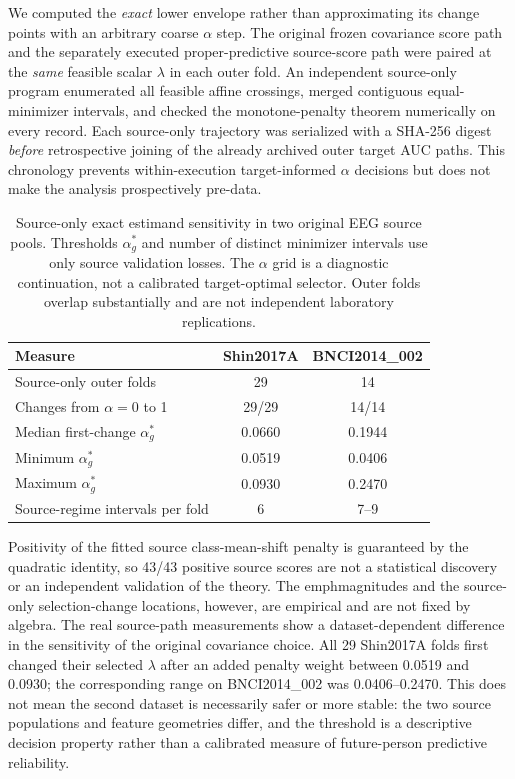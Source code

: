 We computed the \emph{exact} lower envelope rather
than approximating its change points with an
arbitrary coarse $\alpha$ step. The original frozen
covariance score path and the separately executed
proper-predictive source-score path were paired at
the \emph{same} feasible scalar $\lambda$ in each
outer fold. An independent source-only program
enumerated all feasible affine crossings, merged
contiguous equal-minimizer intervals, and checked
the monotone-penalty theorem numerically on every
record. Each source-only trajectory was serialized
with a SHA-256 digest \emph{before} retrospective
joining of the already archived outer target AUC
paths. This chronology prevents within-execution
target-informed $\alpha$ decisions but does not
make the analysis prospectively pre-data.

\begin{table}[tb]
\centering
\small
\caption{Source-only exact estimand sensitivity in two
original EEG source pools. Thresholds $\alpha_g^*$ and
number of distinct minimizer intervals use only source
validation losses. The $\alpha$ grid is a diagnostic
continuation, not a calibrated target-optimal selector.
Outer folds overlap substantially and are not independent
laboratory replications.}
\label{tab:v19-homotopy-thresholds}
\begin{tabular}{lcc}
\toprule
Measure & Shin2017A & BNCI2014\_002\\
\midrule
Source-only outer folds & 29 & 14\\
Changes from $\alpha=0$ to 1 & 29/29 & 14/14\\
Median first-change $\alpha_g^*$ & 0.0660 & 0.1944\\
Minimum $\alpha_g^*$ & 0.0519 & 0.0406\\
Maximum $\alpha_g^*$ & 0.0930 & 0.2470\\
Source-regime intervals per fold & 6 & 7--9\\
\bottomrule
\end{tabular}
\end{table}

Positivity of the fitted source class-mean-shift
penalty is guaranteed by the quadratic identity,
so 43/43 positive source scores are not a
statistical discovery or an independent validation
of the theory. The emph{magnitudes} and the
source-only selection-change locations, however,
are empirical and are not fixed by algebra.
The real source-path measurements show a
dataset-dependent difference in the
sensitivity of the original covariance choice.
All 29 Shin2017A folds first changed their
selected $\lambda$ after an added penalty weight
between 0.0519 and 0.0930; the corresponding
range on BNCI2014\_002 was 0.0406--0.2470.
This does not mean the second dataset is
necessarily safer or more stable: the two
source populations and feature geometries
differ, and the threshold is a descriptive
decision property rather than a calibrated
measure of future-person predictive reliability.

